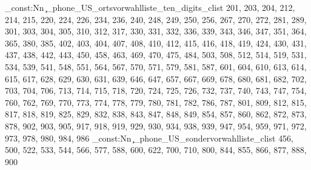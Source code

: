 \clist_const:Nn \c_phone_US_ortsvorwahlliste_ten_digits_clist {201,
203,
204,
212,
214,
215,
220,
224,
226,
234,
236,
240,
248,
249,
250,
256,
267,
270,
272,
281,
289,
301,
303,
304,
305,
310,
312,
317,
330,
331,
332,
336,
339,
343,
346,
347,
351,
364,
365,
380,
385,
402,
403,
404,
407,
408,
410,
412,
415,
416,
418,
419,
424,
430,
431,
437,
438,
442,
443,
450,
458,
463,
469,
470,
475,
484,
503,
508,
512,
514,
519,
531,
534,
539,
541,
548,
551,
564,
567,
570,
571,
579,
581,
587,
601,
604,
610,
613,
614,
615,
617,
628,
629,
630,
631,
639,
646,
647,
657,
667,
669,
678,
680,
681,
682,
702,
703,
704,
706,
713,
714,
715,
718,
720,
724,
725,
726,
732,
737,
740,
743,
747,
754,
760,
762,
769,
770,
773,
774,
778,
779,
780,
781,
782,
786,
787,
801,
809,
812,
815,
817,
818,
819,
825,
829,
832,
838,
843,
847,
848,
849,
854,
857,
860,
862,
872,
873,
878,
902,
903,
905,
917,
918,
919,
929,
930,
934,
938,
939,
947,
954,
959,
971,
972,
973,
978,
980,
984,
986}
\clist_const:Nn \c_phone_US_sondervorwahlliste_clist {456,
500,
522,
533,
544,
566,
577,
588,
600,
622,
700,
710,
800,
844,
855,
866,
877,
888,
900}
